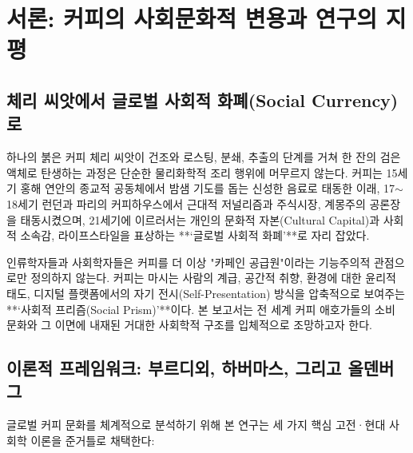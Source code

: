\documentclass[10pt,a4paper]{article}
\begin{document}
\tableofcontents
\newpage

\section{서론: 커피의 사회문화적 변용과 연구의 지평}

\subsection{체리 씨앗에서 글로벌 사회적 화폐(Social Currency)로}
하나의 붉은 커피 체리 씨앗이 건조와 로스팅, 분쇄, 추출의 단계를 거쳐 한 잔의 검은 액체로 탄생하는 과정은 단순한 물리화학적 조리 행위에 머무르지 않는다. 커피는 15세기 홍해 연안의 종교적 공동체에서 밤샘 기도를 돕는 신성한 음료로 태동한 이래, 17$\sim$18세기 런던과 파리의 커피하우스에서 근대적 저널리즘과 주식시장, 계몽주의 공론장을 태동시켰으며, 21세기에 이르러서는 개인의 문화적 자본(Cultural Capital)과 사회적 소속감, 라이프스타일을 표상하는 **‘글로벌 사회적 화폐’**로 자리 잡았다.

인류학자들과 사회학자들은 커피를 더 이상 "카페인 공급원"이라는 기능주의적 관점으로만 정의하지 않는다. 커피는 마시는 사람의 계급, 공간적 취향, 환경에 대한 윤리적 태도, 디지털 플랫폼에서의 자기 전시(Self-Presentation) 방식을 압축적으로 보여주는 **‘사회적 프리즘(Social Prism)’**이다. 본 보고서는 전 세계 커피 애호가들의 소비 문화와 그 이면에 내재된 거대한 사회학적 구조를 입체적으로 조망하고자 한다.

\subsection{이론적 프레임워크: 부르디외, 하버마스, 그리고 올덴버그}
글로벌 커피 문화를 체계적으로 분석하기 위해 본 연구는 세 가지 핵심 고전·현대 사회학 이론을 준거틀로 채택한다:
\end{document}
